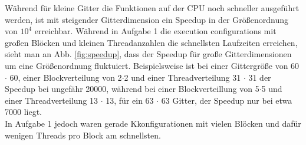 \documentclass[10pt,a4paper]{article}
\begin{document}
Während für kleine Gitter die Funktionen auf der CPU noch schneller ausgeführt werden, ist mit steigender Gitterdimension ein Speedup in der Größenordnung von $10^4$ erreichbar.
Während in Aufgabe 1 die execution configurations mit großen Blöcken und kleinen Threadanzahlen die schnellsten Laufzeiten erreichen, sieht man an
Abb. \ref{fig:speedup}, dass der Speedup für große Gitterdimensionen um eine Größenordnung fluktuiert.
Beispielsweise ist bei einer Gittergröße von \num{60} $\cdot$ \num{60}, einer Blockverteilung von \num{2}$\cdot$\num{2} und einer Threadverteilung
\num{31} $\cdot$ \num{31}  der Speedup bei ungefähr \num{20000}, während bei einer Blockverteillung von \num{5}$\cdot$\num{5} und einer Threadverteilung
\num{13} $\cdot$ \num{13}, für ein \num{63} $\cdot$ \num{63} Gitter, der Speedup nur bei etwa \num{7000} liegt.\\
In Aufgabe 1 jedoch waren gerade Kkonfigurationen mit vielen Blöcken und dafür wenigen Threads pro Block am schnellsten.
\end{document}
